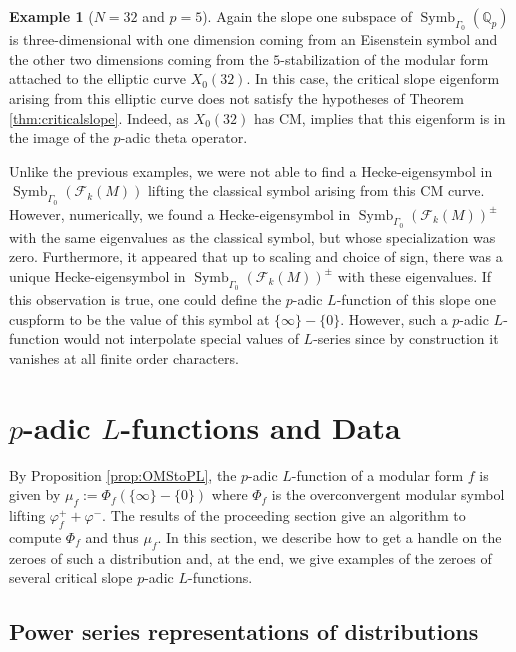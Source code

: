 \documentclass{amsart}
\theoremstyle{plain}
\theoremstyle{definition}
\newtheorem{ex}[thm]{Example}
\newcommand{\F}{{\mathcal F}}
\newcommand{\Q}{{\mathbb Q}}
\newcommand{\Qp}{\Q_p}
\newcommand{\FkM}{\F_k(M)}
\DeclareMathOperator{\Symb}{Symb}
\newcommand{\MSo}[1]{\Symb_{\Gamma_0}(#1)}
\begin{document}
\begin{ex}[$N=32$ and $p=5$]
Again the slope one subspace of $\MSo{\Qp}$ is three-dimensional with one dimension coming from an Eisenstein symbol and the other two dimensions coming from the $5$-stabilization of the modular form attached to the elliptic curve  $X_0(32)$.  In this case, the critical slope eigenform arising from this elliptic curve does not satisfy the hypotheses of Theorem \ref{thm:criticalslope}.  Indeed, as $X_0(32)$ has CM, \cite[Proposition 7.1]{Coleman} implies that this eigenform is in the image of the $p$-adic theta operator.

Unlike the previous examples, we were not able to find a Hecke-eigensymbol in $\MSo{\FkM}$ lifting the classical symbol arising from this CM curve. However, numerically, we found a Hecke-eigensymbol in $\MSo{\FkM}^\pm$ with the same eigenvalues as the classical symbol, but whose specialization was zero.  Furthermore, it appeared that up to scaling and choice of sign, there was a unique Hecke-eigensymbol in $\MSo{\FkM}^\pm$ with these eigenvalues.  If this observation is true, one could define the $p$-adic $L$-function of this slope one cuspform to be the value of this symbol at $\{\infty\} - \{0\}$.  However, such a $p$-adic $L$-function would not interpolate special values of $L$-series since by construction it vanishes at all finite order characters.
\end{ex}



\section{$p$-adic $L$-functions and Data}
\label{sec:pL}


By Proposition \ref{prop:OMStoPL}, the $p$-adic $L$-function of a modular form $f$ is given by  $\mu_f := \Phi_f(\{\infty\} - \{0\})$ where $\Phi_f$ is the overconvergent modular symbol lifting $\varphi_f^+ + \varphi^-$.  The results of the proceeding section give an algorithm to compute $\Phi_f$ and thus $\mu_f$.  In this section, we describe how to get a handle on the zeroes of such a distribution and, at the end, we give examples of the zeroes of several critical slope $p$-adic $L$-functions.

\subsection{Power series representations of distributions}
\end{document}
